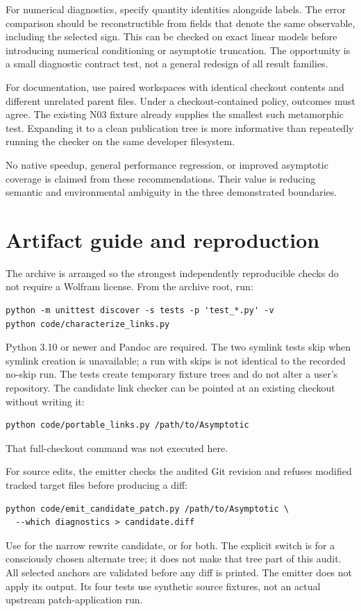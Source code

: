 \documentclass[11pt,letterpaper]{article}
\newcommand{\code}[1]{\texttt{\detokenize{#1}}}
\begin{document}
For numerical diagnostics, specify quantity identities alongside labels. The
error comparison should be reconstructible from fields that denote the same
observable, including the selected sign. This can be checked on exact linear
models before introducing numerical conditioning or asymptotic truncation.
The opportunity is a small diagnostic contract test, not a general redesign of
all result families.

For documentation, use paired workspaces with identical checkout contents and
different unrelated parent files. Under a checkout-contained policy, outcomes
must agree. The existing N03 fixture already supplies the smallest such
metamorphic test. Expanding it to a clean publication tree is more informative
than repeatedly running the checker on the same developer filesystem.

No native speedup, general performance regression, or improved asymptotic
coverage is claimed from these recommendations. Their value is reducing
semantic and environmental ambiguity in the three demonstrated boundaries.

\section{Artifact guide and reproduction}

The archive is arranged so the strongest independently reproducible checks do
not require a Wolfram license. From the archive root, run:
\begin{lstlisting}
python -m unittest discover -s tests -p 'test_*.py' -v
python code/characterize_links.py
\end{lstlisting}
Python 3.10 or newer and Pandoc are required. The two symlink tests skip when
symlink creation is unavailable; a run with skips is not identical to the
recorded no-skip run. The tests create temporary fixture trees and do not alter
a user's repository. The candidate link checker can be pointed at an existing
checkout without writing it:
\begin{lstlisting}
python code/portable_links.py /path/to/Asymptotic
\end{lstlisting}
That full-checkout command was not executed here.

For source edits, the emitter checks the audited Git revision and refuses
modified tracked target files before producing a diff:
\begin{lstlisting}
python code/emit_candidate_patch.py /path/to/Asymptotic \
  --which diagnostics > candidate.diff
\end{lstlisting}
Use \code{--which assumptions} for the narrow rewrite candidate, or
\code{--which all} for both. The explicit \code{--skip-commit-check} switch is
for a consciously chosen alternate tree; it does not make that tree part of
this audit. All selected anchors are validated before any diff is printed.
The emitter does not apply its output. Its four tests use synthetic source
fixtures, not an actual upstream patch-application run.
\end{document}
